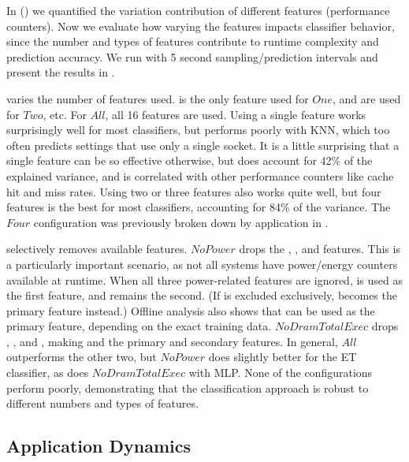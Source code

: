In  () we quantified the variation contribution of different features (performance counters).
Now we evaluate how varying the features impacts classifier behavior, since the number and types of features contribute to runtime complexity and prediction accuracy.
We run with 5 second sampling/prediction intervals and present the results in .

 varies the number of features used.
 is the only feature used for $One$,  and  are used for $Two$, etc.
For $All$, all 16 features are used.
Using a single feature works surprisingly well for most classifiers, but performs poorly with KNN, which too often predicts settings that use only a single socket.
It is a little surprising that a single feature can be so effective otherwise, but  does account for 42\% of the explained variance, and is correlated with other performance counters like cache hit and miss rates.
Using two or three features also works quite well, but four features is the best for most classifiers, accounting for 84\% of the variance.
The $Four$ configuration was previously broken down by application in .

 selectively removes available features.
$NoPower$ drops the , , and  features.
This is a particularly important scenario, as not all systems have power/energy counters available at runtime.
When all three power-related features are ignored,  is used as the first feature, and  remains the second.
(If  is excluded exclusively,  becomes the primary feature instead.)
Offline analysis also shows that  can be used as the primary feature, depending on the exact training data.
$NoDramTotalExec$ drops , , and , making  and  the primary and secondary features.
In general, $All$ outperforms the other two, but $NoPower$ does slightly better for the ET classifier, as does $NoDramTotalExec$ with MLP.
None of the configurations perform poorly, demonstrating that the classification approach is robust to different numbers and types of features.


\subsection{Application Dynamics}
\label{sec:eval-dynamics}

